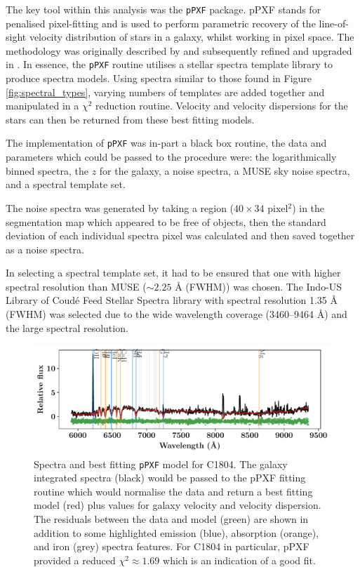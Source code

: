 \documentclass[12pt, twocolumn, nofootinbib]{revtex4-1}    %
\begin{document}
The key tool within this analysis was the \texttt{pPXF} package. pPXF stands for penalised pixel-fitting and is used to perform parametric recovery of the line-of-sight velocity distribution of stars in a galaxy, whilst working in pixel space. The methodology was originally described by \cite{2004PASP..116..138C} and subsequently refined and upgraded in \cite{2017MNRAS.466..798C}. In essence, the \texttt{pPXF} routine utilises a stellar spectra template library to produce spectra models. Using spectra similar to those found in Figure \ref{fig:spectral_types}, varying numbers of templates are added together and manipulated in a $\chi^2$ reduction routine. Velocity and velocity dispersions for the stars can then be returned from these best fitting models.

The implementation of \texttt{pPXF} was in-part a black box routine, the data and parameters which could be passed to the procedure were: the logarithmically binned spectra, the $z$ for the galaxy, a noise spectra, a MUSE sky noise spectra, and a spectral template set. 

The noise spectra was generated by taking a region ($40\times 34$ pixel$^2$) in the segmentation map which appeared to be free of objects, then the standard deviation of each individual spectra pixel was calculated and then saved together as a noise spectra. 

In selecting a spectral template set, it had to be ensured that one with higher spectral resolution than MUSE ($\sim2.25$ {\AA} (FWHM)) was chosen. The Indo-US Library of Coud{\'e} Feed Stellar Spectra \citep{2004ApJS..152..251V} library with spectral resolution 1.35 {\AA} (FWHM) was selected due to the wide wavelength coverage (3460--9464 {\AA}) and the large spectral resolution. 

\begin{figure}
\includegraphics[width=\textwidth]{data/cube_1804_spectra_complete}
\caption{Spectra and best fitting \texttt{pPXF} model for C1804. The galaxy integrated spectra (black) would be passed to the pPXF fitting routine which would normalise the data and return a best fitting model (red) plus values for galaxy velocity and velocity dispersion. The residuals between the data and model (green) are shown in addition to some highlighted emission (blue), absorption (orange), and iron (grey) spectra features. For C1804 in particular, pPXF provided a reduced $\chi^2 \approx 1.69$ which is an indication of a good fit.}
\label{fig:ppxf_spectra}
\end{figure}
\end{document}
